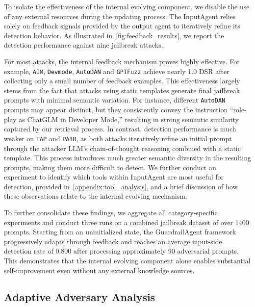 \documentclass[letterpaper,twocolumn,10pt]{article}
\newcommand{\mypara}[1]{\noindent{\bf {#1}.} \xspace}
\newcommand{\agentname}{GuardrailAgent\xspace}
\newcommand{\inputagent}{InputAgent\xspace}
\begin{document}
\mypara{Internal Evolving Component}
To isolate the effectiveness of the internal evolving component, we disable the use of any external resources during the updating process.
The \inputagent relies solely on feedback signals provided by the output agent to iteratively refine its detection behavior.
As illustrated in~\autoref{fig:feedback_results}, we report the detection performance against nine jailbreak attacks.

For most attacks, the internal feedback mechanism proves highly effective.
For example, \texttt{AIM}, \texttt{Devmode}, \texttt{AutoDAN} and \texttt{GPTFuzz} achieve nearly 1.0 DSR after collecting only a small number of feedback examples.
This effectiveness largely stems from the fact that attacks using static templates generate final jailbreak prompts with minimal semantic variation.
For instance, different \texttt{AutoDAN} prompts may appear distinct, but they consistently convey the instruction ``role-play as ChatGLM in Developer Mode,'' resulting in strong semantic similarity captured by our retrieval process.
In contrast, detection performance is much weaker on \texttt{TAP} and \texttt{PAIR}, as both attacks iteratively refine an initial prompt through the attacker LLM's chain-of-thought reasoning combined with a static template.
This process introduces much greater semantic diversity in the resulting prompts, making them more difficult to detect.
We further conduct an experiment to identify which tools within \inputagent are most useful for detection, provided in~\autoref{appendix:tool_analysis}, and a brief discussion of how these observations relate to the internal evolving mechanism.

To further consolidate these findings, we aggregate all category-specific experiments and conduct three runs on a combined jailbreak dataset of over 1400 prompts.
Starting from an uninitialized state, the \agentname framework progressively adapts through feedback and reaches an average input-side detection rate of 0.800 after processing approximately 90 adversarial prompts.
This demonstrates that the internal evolving component alone enables substantial self-improvement even without any external knowledge sources.

\subsection{Adaptive Adversary Analysis}
\label{sec:adaptive}
\end{document}
